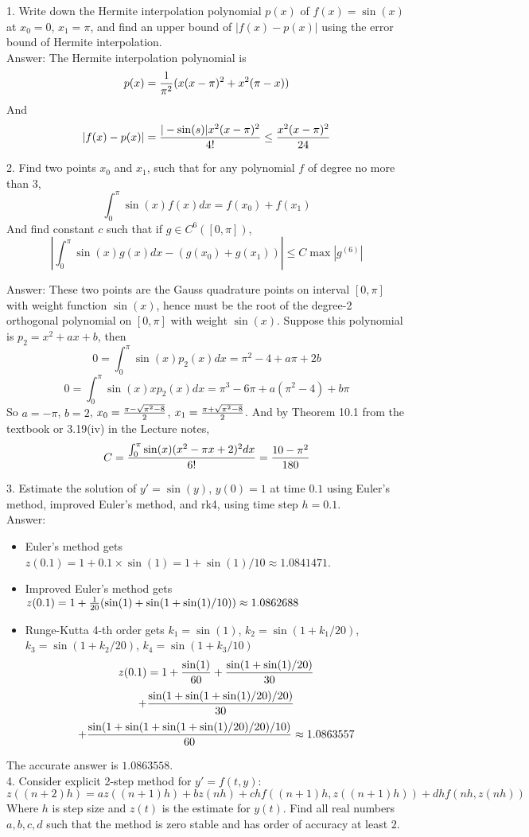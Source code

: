 \documentclass[20pt]{article} %
\theoremstyle{break}
\begin{document}
1. Write down the Hermite interpolation polynomial $p(x)$ of $f(x)=\sin(x)$ at $x_0=0$, $x_1=\pi$, and find an upper bound of $|f(x)-p(x)|$ using the error bound of Hermite interpolation.\\

Answer: The Hermite interpolation polynomial is
\[p(x)={1\over \pi^2}(x(x-\pi)^2+x^2(\pi-x))\]
And
\[|f(x)-p(x)|={|-\sin(s)|x^2(x-\pi)^2\over 4!}\leq{x^2(x-\pi)^2\over 24}\]

2. Find two points $x_0$ and $x_1$, such that for any polynomial $f$ of degree no more than $3$,
\[\int_0^\pi\sin(x)f(x)dx=f(x_0)+f(x_1)\]
And find constant $c$ such that if $g\in C^6([0, \pi])$,
\[|\int_0^\pi\sin(x)g(x)dx-(g(x_0)+g(x_1))|\leq C\max|g^{(6)}|\]

Answer: These two points are the Gauss quadrature points on interval $[0, \pi]$ with weight function $\sin(x)$, hence must be the root of the degree-2 orthogonal polynomial on $[0, \pi]$ with weight $\sin(x)$. Suppose this polynomial is $p_2=x^2+ax+b$, then
\[0=\int_0^\pi \sin(x)p_2(x)dx=\pi^2-4+a\pi+2b\]
\[0=\int_0^\pi \sin(x)xp_2(x)dx=\pi^3-6\pi+a(\pi^2-4)+b\pi\]
So $a=-\pi$, $b=2$, $x_0={\pi-\sqrt{\pi^2-8}\over 2}$, $x_1={\pi+\sqrt{\pi^2-8}\over 2}$.
And by Theorem 10.1 from the textbook or 3.19(iv) in the Lecture notes,
\[C={\int_0^\pi\sin(x)(x^2-\pi x+2)^2dx\over 6!}={10-\pi^2\over 180}\]

3. Estimate the solution of $y'=\sin(y)$, $y(0)=1$ at time $0.1$ using Euler's method, improved Euler's method, and rk4, using time step $h=0.1$. \\

Answer:
\begin{itemize}
\item Euler's method gets $z(0.1)=1+0.1\times\sin(1)=1+\sin(1)/10\approx 1.0841471$.
\item Improved Euler's method gets $z(0.1)=1+{1\over 20}(\sin(1)+\sin(1+\sin(1)/10))\approx 1.0862688$
\item Runge-Kutta 4-th order gets $k_1=\sin(1)$, $k_2=\sin(1+k_1/20)$, $k_3=\sin(1+k_2/20)$, $k_4=\sin(1+k_3/10)$
  \[z(0.1)=1+{\sin(1)\over 60}+{\sin(1+\sin(1)/20)\over 30}\]
  \[+{\sin(1+\sin(1+\sin(1)/20)/20)\over 30}\]
  \[+{\sin(1+\sin(1+\sin(1+\sin(1)/20)/20)/10)\over 60}\approx 1.0863557\]
\end{itemize}
The accurate answer is $1.0863558$.\\


4. Consider explicit 2-step method for $y'=f(t, y)$:
\[z((n+2)h)=az((n+1)h)+bz(nh)+chf((n+1)h, z((n+1)h))+dhf(nh, z(nh))\]
Where $h$ is step size and $z(t)$ is the estimate for $y(t)$. Find all real numbers $a, b, c, d$ such that the method is zero stable and has order of accuracy at least $2$.
\end{document}
